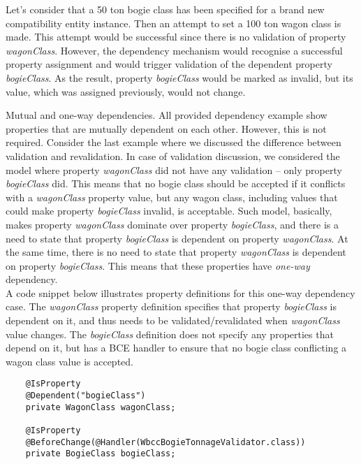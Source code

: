   Let's consider that a 50 ton bogie class has been specified for a brand new compatibility entity instance.
  Then an attempt to set a 100 ton wagon class is made.
  This attempt would be successful since there is no validation of property \emph{wagonClass}.
  However, the dependency mechanism would recognise a successful property assignment and would trigger validation of the dependent property \emph{bogieClass}.
  As the result, property \emph{bogieClass} would be marked as invalid, but its value, which was assigned previously, would not change.
  
  \begin{notebox}{Mutual and one-way dependencies.}{\label{nb:MutialDependencyOrNot}}
    All provided dependency example show properties that are mutually dependent on each other.
    However, this is not required.
    Consider the last example where we discussed the difference between validation and revalidation.
    In case of validation discussion, we considered the model where property \emph{wagonClass} did not have any validation -- only property \emph{bogieClass} did.
    This means that no bogie class should be accepted if it conflicts with a \emph{wagonClass} property value, but any wagon class, including values that could make property \emph{bogieClass} invalid, is acceptable.
    Such model, basically, makes property \emph{wagonClass} dominate over property \emph{bogieClass}, and there is a need to state that property \emph{bogieClass} is dependent on property \emph{wagonClass}.
    At the same time, there is no need to state that property \emph{wagonClass} is dependent on property \emph{bogieClass}.    
    This means that these properties have \emph{one-way} dependency.\\

    A code snippet below illustrates property definitions for this one-way dependency case.
    The \emph{wagonClass} property definition specifies that property \emph{bogieClass} is dependent on it, and thus needs to be validated/revalidated when \emph{wagonClass} value changes.
    The \emph{bogieClass} definition does not specify any properties that depend on it, but has a BCE handler to ensure that no bogie class conflicting a wagon class value is accepted.

    \begin{lstlisting}
    @IsProperty
    @Dependent("bogieClass")
    private WagonClass wagonClass;

    @IsProperty
    @BeforeChange(@Handler(WbccBogieTonnageValidator.class))
    private BogieClass bogieClass;
    \end{lstlisting}
  
  \end{notebox}

